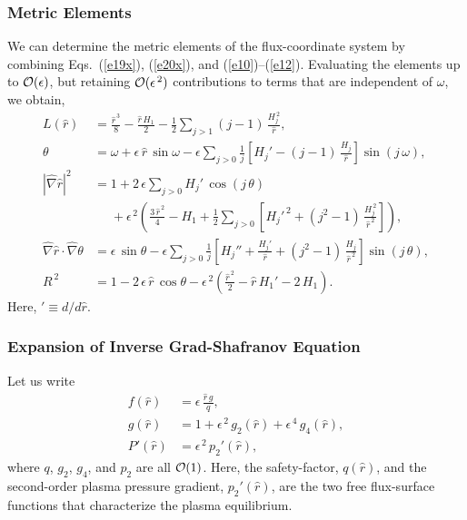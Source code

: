 \documentclass[12pt,prb,aps]{revtex4-1}
\begin{document}
\subsubsection{Metric Elements}\label{metric}
We can determine the metric elements of the flux-coordinate system by combining Eqs.~(\ref{e19x}), (\ref{e20x}), and  (\ref{e10})--(\ref{e12}).
Evaluating the elements up to ${\cal O}(\epsilon)$, but retaining ${\cal O}(\epsilon^{\,2})$ contributions to terms that are independent of
$\omega$, we obtain,\cite{tj,tj1}
\begin{align}\label{epdef}
L(\hat{r})&= \frac{\hat{r}^{\,3}}{8} -\frac{\hat{r}\,H_1}{2}-\frac{1}{2}\sum_{j>1}(j-1)\,\frac{H_j^{\,2}}{\hat{r}},\\[0.5ex]
\theta &= \omega+\epsilon\,\hat{r}\,\sin\omega - \epsilon\sum_{j>0}\frac{1}{j}\left[H_j'-(j-1)\,\frac{H_j}{\hat{r}}\right]\sin(j\,\omega),\label{e22y}\\[0.5ex]
|\hat{\nabla} \hat{r}|^2 &= 1 +2\,\epsilon\sum_{j>0}H_j'\,\cos(j\,\theta)  \nonumber\\[0.5ex]
&\phantom{=}+\epsilon^{\,2}\left(\frac{3\,\hat{r}^{\,2}}{4}-H_1+
\frac{1}{2}\sum_{j>0}\left[H_j'^{\,2}+(j^2-1)\,\frac{H_j^{\,2}}{\hat{r}^{\,2}}\right]\right),\label{e19}\\[0.5ex]
\hat{\nabla}\hat{r}\cdot\hat{\nabla}\theta&=\epsilon\,\sin\theta
-\epsilon\sum_{j>0}\frac{1}{j}\left[H_j''+\frac{H_j'}{\hat{r}}+(j^2-1)\,\frac{H_j}{\hat{r}^{\,2}}\right]\sin(j\,\theta),\label{e20uu}
\\[0.5ex]
R^{\,2}&= 1-2\,\epsilon\,\hat{r}\,\cos\theta -\epsilon^{\,2}\left(\frac{\hat{r}^{\,2}}{2}-\hat{r}\,H_1'-2\,H_1\right).\label{e25a}
\end{align}
Here, $'\equiv d/d\hat{r}$.

\subsubsection{Expansion of Inverse Grad-Shafranov Equation}\label{exp}
Let us write\,\cite{tj,tj1}
\begin{align}\label{e26v}
f(\hat{r})&= \epsilon\,\frac{\hat{r}\,g}{q},\\[0.5ex]
g(\hat{r}) &= 1+ \epsilon^{\,2}\,g_2(\hat{r}) + \epsilon^{\,4}\,g_4(\hat{r}),\label{e27v}\\[0.5ex]
P'(\hat{r}) &= \epsilon^{\,2}\,p_2'(\hat{r}),\label{eq1}
\end{align}
where $q$,  $g_2$, $g_4$, and $p_2$ are all ${\cal O}(1)$. Here, the safety-factor, $q(\hat{r})$, and the second-order plasma
pressure gradient, $p_2'(\hat{r})$, are the two free flux-surface functions that characterize the plasma equilibrium.
\end{document}
